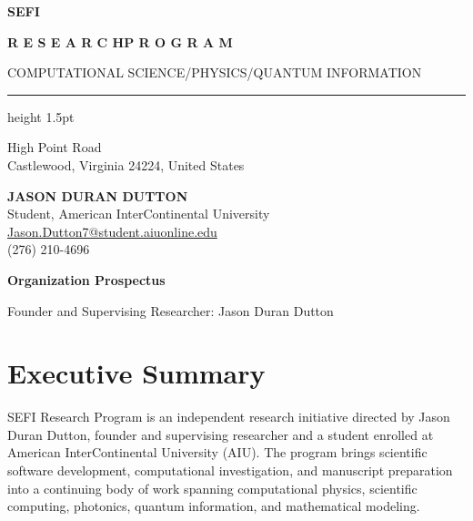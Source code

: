 \documentclass[10pt,letterpaper]{article}
\begin{document}
\color{Ink}
\thispagestyle{empty}
\noindent\begin{minipage}[c]{0.17\linewidth}
\end{minipage}\hfill
\begin{minipage}[c]{0.81\linewidth}
{\sffamily\fontsize{38}{41}\selectfont\bfseries\color{Ink}SEFI}\par
\vspace{3pt}
{\sffamily\small\bfseries\color{Ink}R E S E A R C H\quad P R O G R A M}
\end{minipage}\par
\vspace{0.12in}
{\sffamily\fontsize{7.5}{9}\selectfont\color{Periwinkle}COMPUTATIONAL SCIENCE\quad /\quad PHYSICS\quad /\quad QUANTUM INFORMATION}\par
{\color{Periwinkle}\hrule height 1.5pt}
\vspace{0.06in}
\noindent\begin{minipage}[t]{0.48\linewidth}
{\sffamily\fontsize{8}{10} High Point Road\\Castlewood, Virginia 24224, United States}
\end{minipage}\hfill
\begin{minipage}[t]{0.49\linewidth}
{\sffamily\fontsize{8}{10}\selectfont\textbf{JASON DURAN DUTTON}\\Student, American InterContinental University\\\href{mailto:Jason.Dutton7@student.aiuonline.edu}{Jason.Dutton7@student.aiuonline.edu}\\(276) 210-4696}
\end{minipage}\par
\vspace{0.2in}
{\sffamily\fontsize{21}{25}\selectfont\bfseries Organization Prospectus}\par
{\small Founder and Supervising Researcher: Jason Duran Dutton}\par
\vspace{0.12in}
\section{Executive Summary}
SEFI Research Program is an independent research initiative directed by Jason Duran Dutton, founder and supervising researcher and a student enrolled at American InterContinental University (AIU). The program brings scientific software development, computational investigation, and manuscript preparation into a continuing body of work spanning computational physics, scientific computing, photonics, quantum information, and mathematical modeling.
\end{document}
